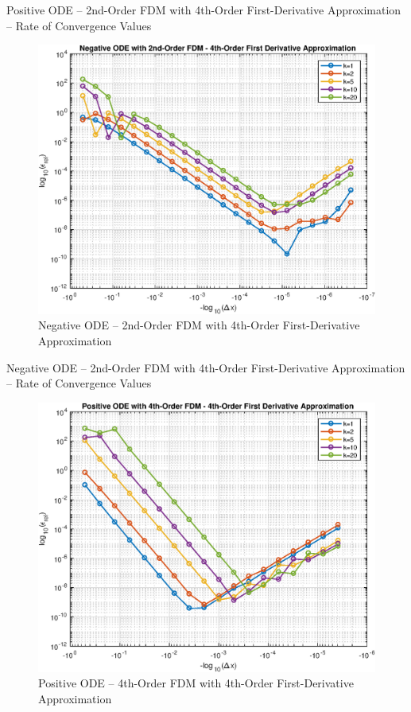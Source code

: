 \documentclass[10pt, reqno]{article}		%
\numberwithin{equation}{section}
\begin{document}
\vfill

\begin{table}[H]
	
	\caption{Positive ODE -- 2nd-Order FDM with 4th-Order First-Derivative Approximation -- Rate of Convergence Values}	
\end{table}\begin{figure}[H]

\begin{center}
	\includegraphics[width = 0.76\linewidth]{negative_ode_order_2_fd_order_4}
	\caption{Negative ODE -- 2nd-Order FDM with 4th-Order First-Derivative Approximation}	
\end{center}
\end{figure}

\vfill

\begin{table}[H]
	
	\caption{Negative ODE -- 2nd-Order FDM with 4th-Order First-Derivative Approximation -- Rate of Convergence Values}	
\end{table}

\begin{figure}[H]
	\begin{center}
		\includegraphics[width = 0.76\linewidth]{positive_ode_order_4_fd_order_4}
		\caption{Positive ODE -- 4th-Order FDM with 4th-Order First-Derivative Approximation}	
	\end{center}
\end{figure}
\end{document}
